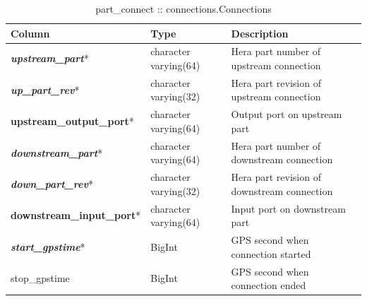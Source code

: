 \documentclass{article}
\begin{document}
\begin{table}[h]
\centering
\caption{part\_connect :: connections.Connections}
\begin{tabular}{| l | l | l |} \hline
{\bf Column} & {\bf Type} & {\bf Description} \\ \hline
{\bf \em upstream\_part}* &  character varying(64) & Hera part number of upstream connection \\ \hline
{\bf \em up\_part\_rev}* & character varying(32) & Hera part revision of upstream connection \\ \hline
{\bf upstream\_output\_port}* & character varying(64) & Output port on upstream part \\ \hline
{\bf \em downstream\_part}* & character varying(64) & Hera part number of downstream connection \\ \hline
{\bf \em down\_part\_rev}* & character varying(32) & Hera part revision of downstream connection \\ \hline
{\bf downstream\_input\_port}* & character varying(64) & Input port on downstream part \\ \hline
{\bf \em start\_gpstime}* & BigInt & GPS second when connection started \\ \hline
stop\_gpstime & BigInt & GPS second when connection ended \\ \hline
\end{tabular}
\end{table}
\end{document}
